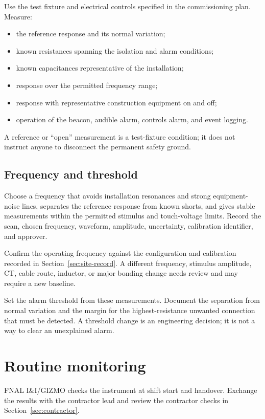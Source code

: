 \documentclass[11pt]{article}
\begin{document}
Use the test fixture and electrical controls specified in the commissioning plan. Measure:

\begin{itemize}
  \item the reference response and its normal variation;
  \item known resistances spanning the isolation and alarm conditions;
  \item known capacitances representative of the installation;
  \item response over the permitted frequency range;
  \item response with representative construction equipment on and off;
  \item operation of the beacon, audible alarm, controls alarm, and event logging.
\end{itemize}

A reference or ``open'' measurement is a test-fixture condition; it does not instruct anyone to disconnect the permanent safety ground.

\subsection{Frequency and threshold}

Choose a frequency that avoids installation resonances and strong equipment-noise lines, separates the reference response from known shorts, and gives stable measurements within the permitted stimulus and touch-voltage limits. Record the scan, chosen frequency, waveform, amplitude, uncertainty, calibration identifier, and approver.

Confirm the operating frequency against the configuration and calibration recorded in Section~\ref{sec:site-record}. A different frequency, stimulus amplitude, CT, cable route, inductor, or major bonding change needs review and may require a new baseline.

Set the alarm threshold from these measurements. Document the separation from normal variation and the margin for the highest-resistance unwanted connection that must be detected. A threshold change is an engineering decision; it is not a way to clear an unexplained alarm.

\section{Routine monitoring}

FNAL I\&I/GIZMO checks the instrument at shift start and handover. Exchange the results with the contractor lead and review the contractor checks in Section~\ref{sec:contractor}.
\end{document}
